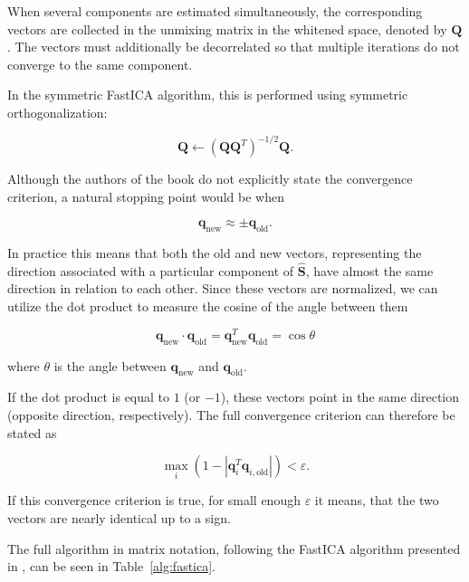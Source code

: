 \documentclass[english]{pwr_wmat_praca_dyplomowa}
\theoremstyle{definition}
\theoremstyle{remark}
\begin{document}
When several components are estimated simultaneously, the corresponding vectors are collected in the unmixing matrix in the whitened space, denoted by $\mathbf{Q}$. The vectors must additionally be decorrelated so that multiple iterations do not converge to the same component. 

\newpage
In the symmetric FastICA algorithm, this is performed using symmetric orthogonalization:

\begin{equation}
    \mathbf{Q} \gets \left( \mathbf{Q}\mathbf{Q}^T \right)^{-1/2}\mathbf{Q}.
\end{equation}

Although the authors of the book \cite{ica} do not explicitly state the convergence criterion, a natural stopping point would be when 

\begin{equation}
    \mathbf{q}_{\mathrm{new}} \approx \pm \mathbf{q}_{\mathrm{old}}.
\end{equation}

In practice this means that both the old and new vectors, representing the direction associated with a particular component of $\widehat{\mathbf{S}}$, have almost the same direction in relation to each other. Since these vectors are normalized, we can utilize the dot product to measure the cosine of the angle between them

\begin{equation}
    \mathbf{q}_{\mathrm{new}} \cdot \mathbf{q}_{\mathrm{old}} = \mathbf{q}_{\mathrm{new}}^T \mathbf{q}_{\mathrm{old}} = \cos \theta
\end{equation}

where $\theta$ is the angle between $\mathbf{q}_{\mathrm{new}}$ and $\mathbf{q}_{\mathrm{old}}$.

If the dot product is equal to $1$ (or $-1$), these vectors point in the same direction (opposite direction, respectively). The full convergence criterion can therefore be stated as

\begin{equation}
    \max_i \left(1 - |\mathbf{q}_i^T\mathbf{q}_{i,\mathrm{old}}| \right) < \varepsilon.
\end{equation}

If this convergence criterion is true, for small enough $\varepsilon$ it means, that the two vectors are nearly identical up to a sign.

The full algorithm in matrix notation, following the FastICA algorithm presented in \cite[Table 8.4]{ica}, can be seen in Table~\ref{alg:fastica}.
\end{document}
